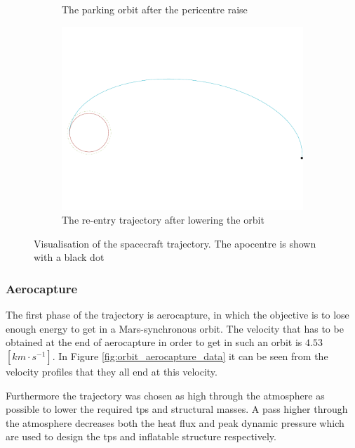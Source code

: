 \begin{figure}
\begin{subfigure}[b]{0.7\textwidth}
		\vspace{-15mm}
		\caption{The parking orbit after the pericentre raise}
		\label{fig:parking_trajectory}
	\end{subfigure}
	\begin{subfigure}[b]{0.7\textwidth}
		\vspace{-22mm}
		\includegraphics[width=\textwidth]{./Figure/Orbit/re-entry_trajectory.pdf}
		\vspace{-25mm}
		\caption{The re-entry trajectory after lowering the orbit}
		\label{fig:re_entry_trajectory}
	\end{subfigure}
	\caption[Visualisation of the spacecraft trajectory]{Visualisation of the spacecraft trajectory. The apocentre is shown with a black dot}
	\label{fig:trajectory}
\end{figure}

\subsubsection{Aerocapture} \label{sec:aerocapture}
The first phase of the trajectory is aerocapture, in which the objective is to lose enough energy to get in a Mars-synchronous orbit. The velocity that has to be obtained at the end of aerocapture in order to get in such an orbit is $4.53$ $\left[km \cdot s^{-1}\right]$. In Figure \ref{fig:orbit_aerocapture_data} it can be seen from the velocity profiles that they all end at this velocity.

Furthermore the trajectory was chosen as high through the atmosphere as possible to lower the required \gls{tps} and structural masses. A pass higher through the atmosphere decreases both the heat flux and peak dynamic pressure which are used to design the \gls{tps} and inflatable structure respectively.

